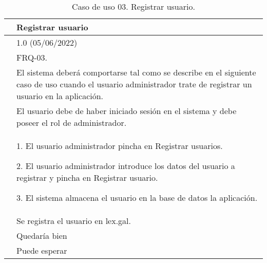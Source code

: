 \begin{table}[H]
\begin{center}
\begin{tabular}{|p{3cm}|p{10cm}|} \hline
\centering {\bf UC-03} & Registrar usuario  \\ \hline\hline
\centering {\bf Versión} & 1.0 (05/06/2022) \\ \hline
\centering {\bf Dependencias} &  FRQ-03. \\ \hline
\centering {\bf Descripción} &  El sistema deberá comportarse tal como se describe en el siguiente caso de uso cuando el usuario administrador trate de registrar un usuario en la aplicación. \\ \hline
\centering {\bf Precondición} &  El usuario debe de haber iniciado sesión en el sistema y debe poseer el rol de administrador. \\ \hline
\centering {\bf Secuencia normal} &  
1. El usuario administrador pincha en Registrar usuarios.

2. El usuario administrador introduce los datos del usuario a registrar y pincha en Registrar usuario.

3. El sistema almacena el usuario en la base de datos la aplicación.
\\ \hline
\centering {\bf Postcondición} &  Se registra el usuario en lex.gal. \\ \hline
\centering {\bf Importancia} & Quedaría bien \\ \hline
\centering {\bf Urgencia} & Puede esperar \\ \hline
\end{tabular}
\caption{Caso de uso 03. Registrar usuario.}
\label{enlaceUC3}
\end{center}
\end{table}


